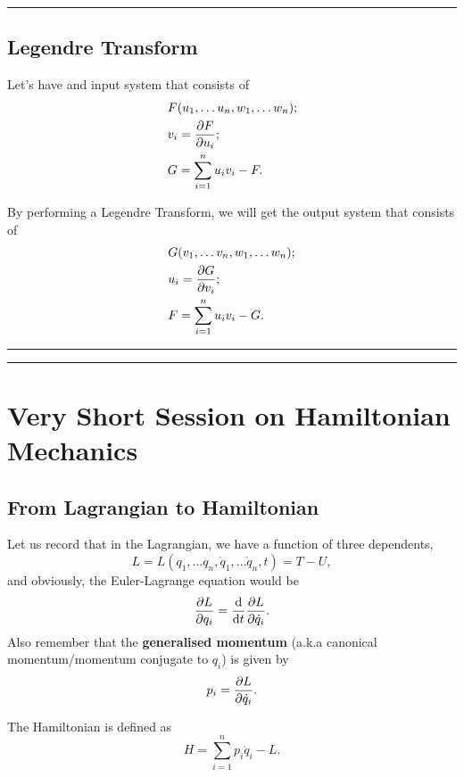 \documentclass[12pt,english]{article}
\numberwithin{equation}{subsection}
\begin{document}
\par\noindent\rule{\textwidth}{0.4pt}
\subsection{Legendre Transform}
Let's have and input system that consists of
\begin{align*}
     & F(u_1, \dots u_n, w_1, \dots w_n); \\
     & v_i = \pdv{F}{u_i};                \\
     & G = \sum_{i = 1}^{n} u_i v_i - F.
\end{align*}

By performing a Legendre Transform, we will get the output system that consists of
\begin{align*}
     & G(v_1, \dots v_n, w_1, \dots w_n); \\
     & u_i = \pdv{G}{v_i};                \\
     & F = \sum_{i = 1}^{n} u_i v_i - G.
\end{align*}

\par\noindent\rule{\textwidth}{0.4pt}
\par\noindent\rule{\textwidth}{0.4pt}
\section{Very Short Session on Hamiltonian Mechanics}
\subsection{From Lagrangian to Hamiltonian}
Let us record that in the Lagrangian, we have a function of three dependents,
\begin{equation}
    L = L(q_1, \dots q_n, \dot{q}_1, \dots \dot{q}_n, t) = T - U,
\end{equation}
and obviously, the Euler-Lagrange equation would be
\begin{equation}
    \pdv{L}{q_i} = \dv{t}\pdv{L}{\dot{q}_i}.
\end{equation}
Also remember that the \textbf{generalised momentum} (a.k.a canonical momentum/momentum conjugate to $q_i$) is given by
\begin{equation}
    p_i = \pdv{L}{\dot{q}_i}.
\end{equation}

The Hamiltonian is defined as
\begin{equation}
    H = \sum_{i = 1}^{n} p_i \dot{q}_i - L.
\end{equation}
\end{document}
